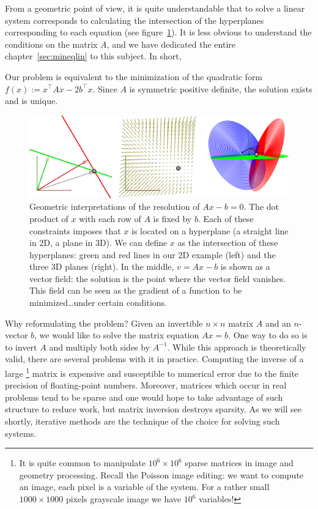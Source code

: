 \documentclass[notitlepage,oneside]{book}
\begin{document}
From a geometric point of view, it is quite understandable that to solve a linear system corresponds to calculating the intersection of
the hyperplanes corresponding to each equation (see figure~\ref{fig:pbd2d}).
It is less obvious to understand the conditions on the matrix $A$, and we have dedicated the entire chapter~\ref{sec:mineqlin} to this subject.
In short,
\begin{framed}
Our problem is equivalent to the minimization of the quadratic form $f(x):=x^\top Ax-2b^\top x$. Since $A$ is symmetric positive definite, the solution exists and is unique.
\end{framed}

\begin{figure}[htb]
  \centering
  \includegraphics[width=.8\linewidth]{img/cg/problem2d.png}
  \caption{Geometric interpretations of the resolution of $Ax-b=0$.
  The dot product of $x$ with each row of $A$ is fixed by $b$.
  Each of these constraints imposes that $x$ is located on a hyperplane (a straight line in 2D, a plane in 3D).
  We can define $x$ as the intersection of these hyperplanes: green and red lines in our 2D example (left) and the three 3D planes (right).
  In the middle, $v=Ax-b$ is shown as a vector field: the solution is the point where the vector field vanishes.
  This field can be seen as  the gradient of a function to be minimized\dots under certain conditions.}
  \label{fig:pbd2d}
\end{figure}


Why reformulating the problem?
Given an invertible $n \times n$ matrix $A$ and an $n$-vector $b$, we would like to solve the matrix equation $Ax = b$.
One way to do so is to invert $A$ and multiply both sides by $A^{-1}$.
While this approach is theoretically valid, there are several problems with it in practice. Computing the inverse of a large
\footnote{It is quite common to manipulate $10^6\times 10^6$ sparse matrices in image and geometry processing.
Recall the Poisson image editing: we want to compute an image, each pixel is a variable of the system. For a rather small $1000\times 1000$ pixels grayscale image we have $10^6$ variables!}
matrix is expensive and susceptible to numerical error due to the finite precision of floating-point numbers.
Moreover, matrices which occur in real problems tend to be sparse and one would hope to take advantage of such structure to reduce
work, but matrix inversion destroys sparsity.
As we will see shortly, iterative methods are the technique of the choice for solving such systems.
\end{document}
